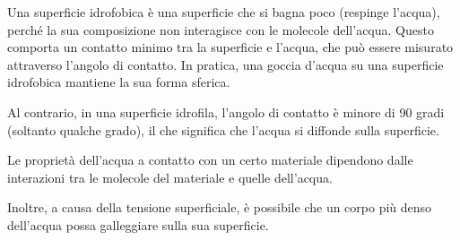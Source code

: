Una superficie idrofobica è una superficie che si bagna poco (respinge l'acqua), perché la sua composizione non interagisce con le molecole dell'acqua. Questo comporta un contatto minimo tra la superficie e l'acqua, che può essere misurato attraverso l'angolo di contatto. In pratica, una goccia d'acqua su una superficie idrofobica mantiene la sua forma sferica.

Al contrario, in una superficie idrofila, l'angolo di contatto è minore di 90 gradi (soltanto qualche grado), il che significa che l'acqua si diffonde sulla superficie.

Le proprietà dell'acqua a contatto con un certo materiale dipendono dalle interazioni tra le molecole del materiale e quelle dell'acqua. 

Inoltre, a causa della tensione superficiale, è possibile che un corpo più denso dell'acqua possa galleggiare sulla sua superficie.